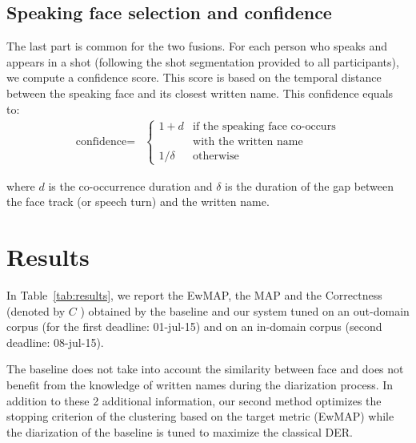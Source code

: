 \documentclass{acm_proc_article-me}
\begin{document}
\subsection{Speaking face selection and confidence}

The last part is common for the two fusions. For each person who speaks and appears in a shot (following the shot segmentation provided to all participants), we compute a confidence score. This score is based on the temporal distance between the speaking face and its closest written name. This confidence equals to:
\begin{align*}
  \text{confidence} = & \left\{
  	\begin{array}{ll}
  		1+d  & \mbox{if the speaking face co-occurs}  \\
  		 	 & \mbox{with the written name}		\\
  		1/\delta &\mbox{otherwise}
  	\end{array}
  \right.
\end{align*}

\noindent where $d$ is the co-occurrence duration and $\delta$ is the duration of the gap between the face track (or speech turn) and the written name.

\section{Results}

In Table~\ref{tab:results}, we report the EwMAP, the MAP and the Correctness (denoted by $C$ ) obtained by the baseline and our system tuned on an out-domain corpus (for the first deadline: 01-jul-15) and on an in-domain corpus (second deadline: 08-jul-15).

The baseline does not take into account the similarity between face and does not benefit from the knowledge of written names during the diarization process. In addition to these 2 additional information, our second method optimizes the stopping criterion of the clustering based on the target metric (EwMAP) while the diarization of the baseline is tuned to maximize the classical DER.
\end{document}
